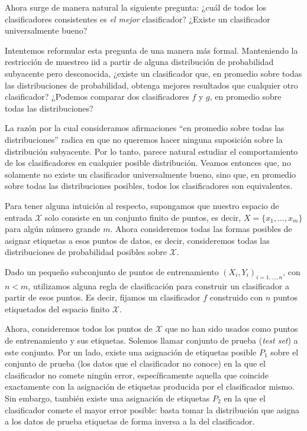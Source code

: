 \documentclass{report}
\begin{document}
Ahora surge de manera natural la siguiente pregunta: ¿cuál de todos los clasificadores consistentes
es \textit{el mejor} clasificador? ¿Existe un clasificador universalmente bueno?

Intentemos reformular esta pregunta de una manera más formal. Manteniendo la restricción de muestreo iid
a partir de alguna distribución de probabilidad subyacente pero desconocida, ¿existe
un clasificador que, en promedio sobre todas las distribuciones de probabilidad, obtenga mejores
resultados que cualquier otro clasificador? ¿Podemos comparar dos clasificadores \(f\) y \(g\),
en promedio sobre todas las distribuciones?

La razón por la cual consideramos afirmaciones ``en promedio sobre todas las distribuciones'' radica
en que no queremos hacer ninguna suposición sobre la distribución subyacente. Por lo tanto, parece
natural estudiar el comportamiento de los clasificadores en cualquier posible distribución. Veamos entonces
que, no solamente no existe un clasificador universalmente bueno, sino que, en promedio sobre todas las distribuciones
posibles, todos los clasificadores son equivalentes.

Para tener alguna intuición al respecto, supongamos que nuestro espacio de entrada \(\mathcal{X}\) solo consiste en un conjunto finito de puntos, es decir,
\(X = \{x_1, \dots, x_m\}\) para algún número grande \(m\). Ahora consideremos todas las formas
posibles de asignar etiquetas a esos puntos de datos, es decir, consideremos todas las distribuciones
de probabilidad posibles sobre \(\mathcal{X}\).

Dado un pequeño subconjunto de puntos de entrenamiento \((X_i, Y_i)_{i=1,\dots,n}\), con $n<m$, utilizamos
alguna regla de clasificación para construir un clasificador a partir de esos puntos. Es decir, fijamos un clasificador $f$
construido con $n$ puntos etiquetados del espacio finito \(\mathcal{X}\).

Ahora, consideremos todos los puntos de \(\mathcal{X}\) que no han sido usados como
puntos de entrenamiento y sus etiquetas. Solemos llamar conjunto de prueba (\textit{test set}) a este conjunto.
Por un lado, existe una asignación de etiquetas posible \(P_1\) sobre el conjunto de prueba (los datos que el clasificador
no conoce) en la que el
clasificador no comete ningún error, específicamente aquella que coincide exactamente con la asignación
de etiquetas producida por el clasificador mismo. Sin embargo, también existe una asignación de
etiquetas \(P_2\) en la que el clasificador comete el mayor error posible: basta tomar la distribución
que asigna a los datos de prueba etiquetas de forma inversa a la del clasificador.
\end{document}
